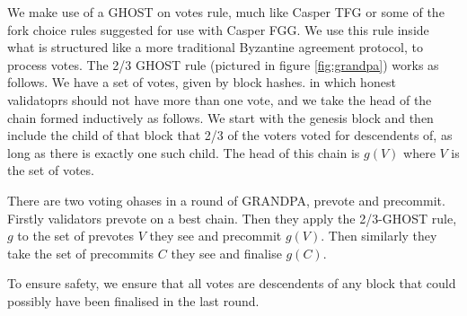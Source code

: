 We make use of a GHOST on votes rule, much like Casper TFG or some of the fork choice rules suggested for use with Casper FGG. We use this rule inside what is structured like a more traditional Byzantine agreement protocol, to process votes. The 2/3 GHOST rule (pictured in figure \ref{fig:grandpa})  works as follows. We have a set of votes, given by block hashes.  in which honest validatoprs should not have more than one vote, and we take the head of the chain formed inductively as follows. We start with the genesis block and then include the child of that block that 2/3 of the voters voted for descendents of, as long as there is exactly one such child. The head of this chain is $g(V)$ where $V$ is the set of votes.

There are two voting ohases in a round of GRANDPA, prevote and precommit. Firstly validators prevote on a best chain. Then they apply the 2/3-GHOST rule, $g$ to the set of prevotes $V$ they see and precommit $g(V)$. Then similarly they take the set of precommits $C$ they see and finalise $g(C)$.

To ensure safety, we ensure that all votes are descendents of any block that could possibly have been finalised in the last round. 

